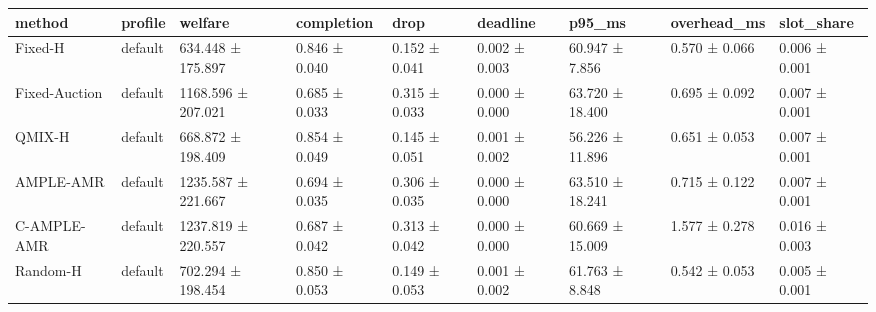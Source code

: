 \begin{tabular}{lllllllll}
\toprule
method & profile & welfare & completion & drop & deadline & p95\_ms & overhead\_ms & slot\_share \\
\midrule
Fixed-H & default & 634.448 ± 175.897 & 0.846 ± 0.040 & 0.152 ± 0.041 & 0.002 ± 0.003 & 60.947 ± 7.856 & 0.570 ± 0.066 & 0.006 ± 0.001 \\
Fixed-Auction & default & 1168.596 ± 207.021 & 0.685 ± 0.033 & 0.315 ± 0.033 & 0.000 ± 0.000 & 63.720 ± 18.400 & 0.695 ± 0.092 & 0.007 ± 0.001 \\
QMIX-H & default & 668.872 ± 198.409 & 0.854 ± 0.049 & 0.145 ± 0.051 & 0.001 ± 0.002 & 56.226 ± 11.896 & 0.651 ± 0.053 & 0.007 ± 0.001 \\
AMPLE-AMR & default & 1235.587 ± 221.667 & 0.694 ± 0.035 & 0.306 ± 0.035 & 0.000 ± 0.000 & 63.510 ± 18.241 & 0.715 ± 0.122 & 0.007 ± 0.001 \\
C-AMPLE-AMR & default & 1237.819 ± 220.557 & 0.687 ± 0.042 & 0.313 ± 0.042 & 0.000 ± 0.000 & 60.669 ± 15.009 & 1.577 ± 0.278 & 0.016 ± 0.003 \\
Random-H & default & 702.294 ± 198.454 & 0.850 ± 0.053 & 0.149 ± 0.053 & 0.001 ± 0.002 & 61.763 ± 8.848 & 0.542 ± 0.053 & 0.005 ± 0.001 \\
\bottomrule
\end{tabular}
